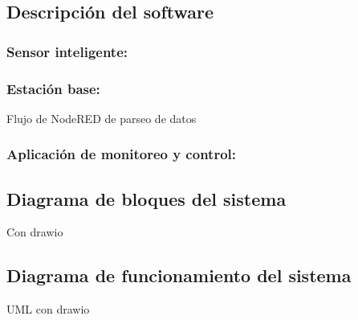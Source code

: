 \subsection{Descripción del software}

\subsubsection{Sensor inteligente:}

\subsubsection{Estación base:}

Flujo de NodeRED de parseo de datos

\subsubsection{Aplicación de monitoreo y control:}

\subsection{Diagrama de bloques del sistema}

Con drawio

\subsection{Diagrama de funcionamiento del sistema}

UML con drawio